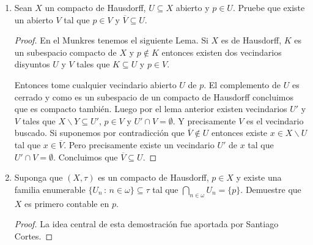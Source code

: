 \documentclass[letter,twoside,12pt]{article}
\begin{document}
\begin{enumerate}
\begin{proof}
		Ahora para probar el enunciado inicial tome cualquier vecindario $ V $ de $ Y $. Tenemos que $ Y \backslash V $ es cerrado. Luego $C = X \times (Y \backslash V) \cap G_f $ es la intersección de dos conjuntos cerrados de $ X \times Y $ y por lo tanto también es cerrado.
		
		Entonces por lo demostrado anteriormente $ \pi_X(C) $ también es cerrado. El complemento de $ \pi_X(C) $ es precisamente $ f^{-1}(V) $. $ x \in f^{-1}(V) $ es equivalente a que $ f(x) \in V $. Tenemos que $ x \times f(x) $ es la única tupla de $ x $ contenida en $ G_f $ pero $ f(x) \not \in (Y \backslash V) $. Esto equivale a que para todo $ y  \in Y $ $ x \times y \not \in C $ luego $ x \not \in \pi_X(C) $.
		
	\end{proof}
	\item Sean $ X $ un compacto de Hausdorff, $ U \subseteq X $ abierto y $ p \in U $. Pruebe que existe un abierto $ V $ tal que $ p \in V $ y $ \overline{V} \subseteq U $.
	\begin{proof}
		En el Munkres tenemos el siguiente Lema. Si $ X $ es de Hausdorff, $ K $ es un subespacio compacto de $ X $ y $ p \not \in K $ entonces existen dos vecindarios disyuntos $ U $ y $ V $ tales que $ K \subseteq U $ y $ p \in V $.
		
		Entonces tome cualquier vecindario abierto $ U $ de $ p $. El complemento de $ U $ es cerrado y como es un subespacio de un compacto de Hausdorff concluimos que es compacto también. Luego por el lema anterior existen vecindarios $ U' $ y $ V $ tales que $ X \backslash Y \subseteq U' $, $ p \in V $ y $ U' \cap V = \emptyset$. Y precisamente $ V $ es el vecindario buscado. Si suponemos por contradicción que $ \overline{V} \not \in U  $ entonces existe $ x \in X \backslash U $ tal que $ x \in \overline{V} $. Pero precisamente existe un vecindario $ U' $ de $ x $ tal que $ U' \cap V = \emptyset $. Concluimos que $ \overline{V} \subseteq U $. 
	\end{proof}
	
	\item Suponga que $ (X, \tau) $ es un compacto de Hausdorff, $ p \in X $ y existe una familia enumerable $ \{U_n\,:\, n \in \omega \} \subseteq \tau $ tal que $ \bigcap_{n \in \omega}U_n =\{p\} $. Demuestre que $ X $ es primero contable en $ p $.
	
	\begin{proof}
		La idea central de esta demostración fue aportada por Santiago Cortes.
		

\end{proof}
\end{enumerate}
\end{document}
